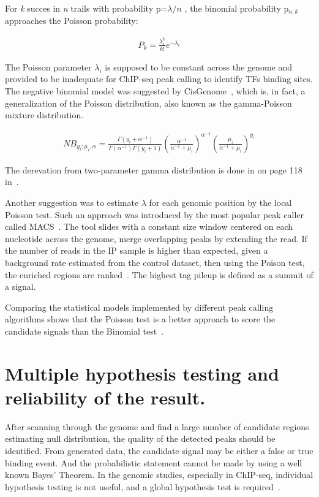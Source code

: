 For \textit{k} succes in \textit{n} trails with probability p=${\lambda / n}$ , the binomial probability p$_{n,k}$ approaches the Poisson probability:

\begin{align*}
    P_k = \frac{\lambda _i ^{k}}{k!} e^{- \lambda _i}
\end{align*}

The Poisson parameter $\lambda_i$ is supposed to be constant across the genome and provided to be inadequate for ChIP-seq peak calling to identify TFs binding sites. 
The negative binomial model was suggested by CisGenome~\cite{ji2008inte}, which is, in fact, a generalization of the Poisson distribution, also known as the gamma-Poisson mixture distribution. 

\begin{align*}
    NB_{y_i; \mu _i, \alpha} = \frac{\Gamma (y_i + \alpha ^{-1})}{\Gamma(\alpha ^{-1})\Gamma(y_i + 1)} \left(\frac{\alpha ^{-1}}{\alpha ^{-1} + \mu_i}\right) ^{\alpha ^{-1}} \left(\frac{ \mu _i}{ \alpha ^{-1} + \mu _i}\right) ^{y _i}
\end{align*}

The derevation from two-parameter gamma distribution is done in on page 118 in~\cite[Cameron and Trivedi (2013)]{cameron2013regression}.

Another suggestion was to estimate $\lambda$ for each genomic position by the local Poisson test. 
Such an approach was introduced by the most popular peak caller called MACS~\cite{zhang2008model}.
The tool slides with a constant size window centered on each nucleotide across the genome, merge overlapping peaks by extending the read.
If the number of reads in the IP sample is higher than expected, given a background rate estimated from the control dataset, then using the Poison test, the enriched regions are ranked~\cite{thomas2017features}. 
The highest tag pileup is defined as a summit of a signal.  

Comparing the statistical models implemented by different peak calling algorithms shows that the Poisson test is a better approach to score the candidate signals than the Binomial test~\cite{thomas2017features}.

\section{Multiple hypothesis testing and reliability of the result.}

After scanning through the genome and find a large number of candidate regions estimating null distribution, the quality of the detected peaks should be identified. 
From generated data, the candidate signal may be either a false or true binding event. 
And the probabilistic statement cannot be made by using a well known Bayes' Theorem. 
In the genomic studies, especially in ChIP-seq, individual hypothesis testing is not useful, and a global hypothesis test is required~\cite{futschik2019omnibus}. 

